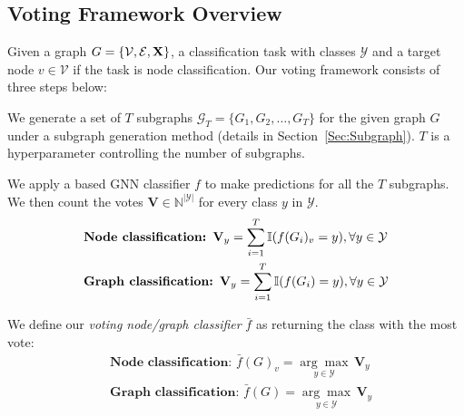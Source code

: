 \subsection{Voting Framework Overview}
Given a graph $G=\{\mathcal{V},\mathcal{E},{\bf X}\}$, a classification task with classes $\mathcal{Y}$ and a target node $v\in\mathcal{V}$ if the task is node classification. Our voting framework consists of three steps below:  

\vspace{+0.05in}
 We generate a set of $T$ subgraphs $\mathcal{G}_T=\{G_{1},G_{2},\dots,G_{T}\}$ for the given graph $G$ under a subgraph generation method (details in Section~\ref{Sec:Subgraph}). $T$ is a hyperparameter controlling the number of subgraphs. 

\vspace{+0.05in}
 We apply a based GNN classifier $f$ 
to make predictions for all the $T$ subgraphs. We then count the votes $\mathbf{V}\in \mathbb{N}^{|\mathcal{Y}|}$ for every class $y$ in $\mathcal{Y}$. 
\begin{align}
\small
& \textbf{Node classification: } \mathbf{V}_y = \sum_{i=1}^{T}\mathbb{I}(f(G_{i})_v=y), \forall y \in \mathcal{Y} \label{eqn:vote_NC} \\
& \textbf{Graph classification: } \mathbf{V}_y = \sum_{i=1}^{T}\mathbb{I}(f(G_{i})=y), \forall y \in \mathcal{Y} \label{eqn:vote_GC} 
\end{align}

\vspace{+0.05in}
 We define our \emph{voting node/graph classifier} $\bar{f}$ as returning the class with the most vote:  
\begin{align}
& \textbf{Node classification: } \bar{f}(G)_v = \underset{y \in \mathcal{Y}}{{\arg\max}} \,  \mathbf{V}_y \label{eqn:vc_NC} \\
& \textbf{Graph classification: } \bar{f}(G) = \underset{y \in \mathcal{Y}}{{\arg\max}} \,  \mathbf{V}_y \label{eqn:vc_GC} 
\end{align}


